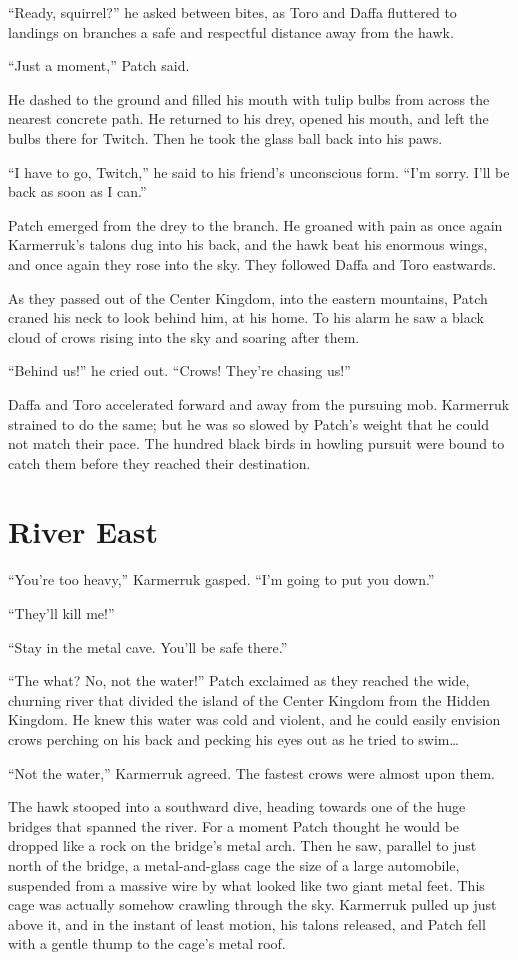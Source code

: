\documentclass[ebook,oneside,openany,17pt]{memoir}
\renewcommand{\thechapter}{\Roman{chapter}}
\newcounter{sections}
\newcommand{\sections}[1]{%
  \section*{#1}
  \addtocounter{sections}{1}%
  \pdfbookmark[1]{#1}{section.\thechapter.\thesections}}
\begin{document}
“Ready, squirrel?” he asked between bites, as Toro and Daffa fluttered
to landings on branches a safe and respectful distance away from the
hawk.

“Just a moment,” Patch said.

He dashed to the ground and filled his mouth with tulip bulbs from
across the nearest concrete path. He returned to his drey, opened his
mouth, and left the bulbs there for Twitch. Then he took the glass
ball back into his paws.

“I have to go, Twitch,” he said to his friend’s unconscious form. “I’m
sorry. I’ll be back as soon as I can.”

Patch emerged from the drey to the branch. He groaned with pain as
once again Karmerruk’s talons dug into his back, and the hawk beat his
enormous wings, and once again they rose into the sky. They followed
Daffa and Toro eastwards.

As they passed out of the Center Kingdom, into the eastern mountains,
Patch craned his neck to look behind him, at his home. To his alarm he
saw a black cloud of crows rising into the sky and soaring after them.

“Behind us!” he cried out. “Crows! They’re chasing us!”

Daffa and Toro accelerated forward and away from the pursuing
mob. Karmerruk strained to do the same; but he was so slowed by
Patch’s weight that he could not match their pace. The hundred black
birds in howling pursuit were bound to catch them before they reached
their destination.


\sections{River East}

“You’re too heavy,” Karmerruk gasped. “I’m going to put you down.”

“They’ll kill me!”

“Stay in the metal cave. You’ll be safe there.”

“The what? No, not the water!” Patch exclaimed as they reached the
wide, churning river that divided the island of the Center Kingdom
from the Hidden Kingdom. He knew this water was cold and violent, and
he could easily envision crows perching on his back and pecking his
eyes out as he tried to swim…

“Not the water,” Karmerruk agreed. The fastest crows were almost upon
them.

The hawk stooped into a southward dive, heading towards one of the
huge bridges that spanned the river. For a moment Patch thought he
would be dropped like a rock on the bridge’s metal arch. Then he saw,
parallel to just north of the bridge, a metal-and-glass cage the size
of a large automobile, suspended from a massive wire by what looked
like two giant metal feet. This cage was actually somehow crawling
through the sky. Karmerruk pulled up just above it, and in the instant
of least motion, his talons released, and Patch fell with a gentle
thump to the cage’s metal roof.
\end{document}
